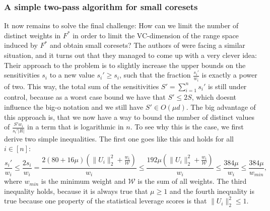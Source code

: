\subsubsection{A simple two-pass algorithm for small coresets}

It now remains to solve the final challenge: How can we limit the
number of distinct weights in $F^\ast$ in order to limit
the VC-dimension of the range space induced by $F^\ast$ and obtain
small coresets? The authors of \cite{on-coresets} were facing
a similar situation, and it turns out that they managed to come
up with a very clever idea: Their approach to the problem is to
slightly increase the upper bounds on the sensitivities $s_i$ to
a new value $s_i' \geq s_i$, such that the fraction $\frac{s_i'}{w_i}$ is
exactly a power of two. This way, the total sum of the sensitivities
$S' = \sum_{i=1}^n s_i'$ is still under control, because as a worst
case bound we have that $S' \leq 2 S$, which doesnt influence the
big-o notation and we still have $S' \in O(\mu d)$.
The big advantage of this approach is, that we now have a way
to bound the number of distinct values of $\frac{S'w_i}{s_i' |R|}$
in a term that is logarithmic in $n$.
To see why this is the case, we first derive two simple
inequalities. The first one goes like this and holds for all
$i \in [n]$:
\begin{equation*}
    \frac{s_i'}{w_i} \leq \frac{2 s_i}{w_i}
    = \frac{2 (80 + 16\mu)(\lVert U_i \rVert_2^2 + \frac{w_i}{\mathcal{W}})}{w_i}
    \leq \frac{192\mu (\lVert U_i \rVert_2^2 + \frac{w_i}{\mathcal{W}})}{w_i}
    \leq \frac{384 \mu}{w_i}
    \leq \frac{384 \mu}{w_{min}},
\end{equation*}
where $w_{min}$ is the minimum weight and $\mathcal{W}$ is the sum
of all weights. The third inequality holds, because it is
always true that $\mu \geq 1$ and the fourth inequality is true because
one property of the statistical leverage scores
is that $\lVert U_i \rVert_2^2 \leq 1$.

